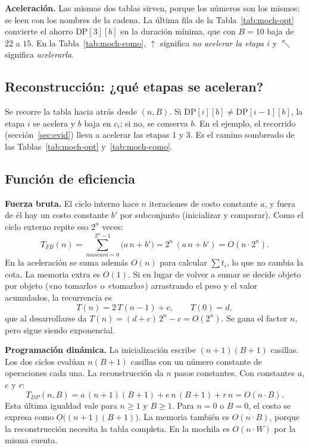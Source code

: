 \documentclass[11pt,a4paper]{article}
\newcommand{\DP}[2]{\mathrm{DP}[#1][#2]}
\theoremstyle{plano}
\begin{document}
\textbf{Aceleración.} Las mismas dos tablas sirven, porque los números son los mismos: se leen con los nombres de la cadena. La última fila de la Tabla~\ref{tab:moch-opt} convierte el ahorro $\DP{3}{b}$ en la duración mínima, que con $B=10$ baja de $22$ a $15$. En la Tabla~\ref{tab:moch-como}, $\uparrow$ significa \textit{no acelerar la etapa $i$} y $\nwarrow$ significa \textit{acelerarla}.

\subsection{Reconstrucción: ¿qué etapas se aceleran?}

Se recorre la tabla hacia atrás desde $(n,B)$. Si $\DP{i}{b}\ne\DP{i-1}{b}$, la etapa $i$ se acelera y $b$ baja en $c_i$; si no, se conserva $b$. En el ejemplo, el recorrido (sección~\ref{sec:evid}) lleva a acelerar las etapas 1 y 3. Es el camino sombreado de las Tablas~\ref{tab:moch-opt} y~\ref{tab:moch-como}.

\subsection{Función de eficiencia}

\textbf{Fuerza bruta.} El ciclo interno hace $n$ iteraciones de costo constante $a$, y fuera de él hay un costo constante $b'$ por subconjunto (inicializar y comparar). Como el ciclo externo repite eso $2^n$ veces:
\begin{equation}
  T_{FB}(n)=\sum_{mascara=0}^{2^n-1}\bigl(a\,n+b'\bigr)=2^n\,(a\,n+b')=O(n\cdot 2^n).
\end{equation}
En la aceleración se suma además $O(n)$ para calcular $\sum t_i$, lo que no cambia la cota. La memoria extra es $O(1)$. Si en lugar de volver a sumar se decide objeto por objeto («no tomarlo» o «tomarlo») arrastrando el peso y el valor acumulados, la recurrencia es
\[
  T(n)=2\,T(n-1)+c,\qquad T(0)=d,
\]
que al desarrollarse da $T(n)=(d+c)\,2^n-c=O(2^n)$. Se gana el factor $n$, pero sigue siendo exponencial.

\textbf{Programación dinámica.} La inicialización escribe $(n+1)(B+1)$ casillas. Los dos ciclos evalúan $n(B+1)$ casillas con un número constante de operaciones cada una. La reconstrucción da $n$ pasos constantes. Con constantes $a$, $e$ y $r$:
\begin{equation}
  T_{DP}(n,B)=a\,(n+1)(B+1)+e\,n\,(B+1)+r\,n=O(n\cdot B).
\end{equation}
Esta última igualdad vale para $n\ge 1$ y $B\ge 1$. Para $n=0$ o $B=0$, el costo se expresa como $O\bigl((n+1)(B+1)\bigr)$. La memoria también es $O(n\cdot B)$, porque la reconstrucción necesita la tabla completa. En la mochila es $O(n\cdot W)$ por la misma cuenta.
\end{document}
